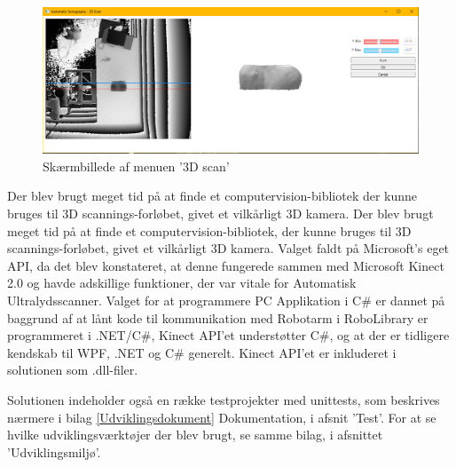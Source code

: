 \begin{figure}[H]
    \centering
    \includegraphics[width=1\textwidth]{figurer/d/GUIskitse/3d_scan}
    \caption{Skærmbillede af menuen '3D scan'}
    \label{screenshot_3dscan}
\end{figure}

Der blev brugt meget tid på at finde et computervision-bibliotek der kunne bruges til 3D scannings-forløbet, givet et vilkårligt 3D kamera. Der blev brugt meget tid på at finde et computervision-bibliotek, der kunne bruges til 3D scannings-forløbet, givet et vilkårligt 3D kamera. Valget faldt på Microsoft's eget API, da det blev konstateret, at denne fungerede sammen med Microsoft Kinect 2.0 og havde adskillige funktioner, der var vitale for Automatisk Ultralydsscanner. 
Valget for at programmere PC Applikation i C\# er dannet på baggrund af at lånt kode til kommunikation med Robotarm i RoboLibrary er programmeret i .NET/C\#, Kinect API'et understøtter C\#, og at der er tidligere kendskab til WPF, .NET og C\# generelt.
\newline
Kinect API'et er inkluderet i solutionen som .dll-filer.

Solutionen indeholder også en række testprojekter med unittests, som beskrives nærmere i bilag \ref{Udviklingsdokument} Dokumentation, i afsnit 'Test'. For at se hvilke udviklingsværktøjer der blev brugt, se samme bilag, i afsnittet 'Udviklingsmiljø'. 

